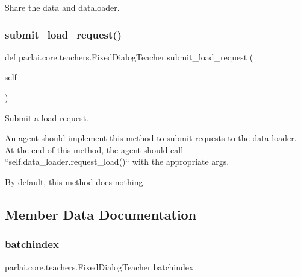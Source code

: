 \begin{DoxyVerb}Share the data and dataloader.
\end{DoxyVerb}
 \mbox{\label{classparlai_1_1core_1_1teachers_1_1FixedDialogTeacher_a8923ee1255939443c7a6ea1532a2fe40}} 
\subsubsection{\texorpdfstring{submit\+\_\+load\+\_\+request()}{submit\_load\_request()}}
{\footnotesize\ttfamily def parlai.\+core.\+teachers.\+Fixed\+Dialog\+Teacher.\+submit\+\_\+load\+\_\+request (\begin{DoxyParamCaption}\item[{}]{self }\end{DoxyParamCaption})}

\begin{DoxyVerb}Submit a load request.

An agent should implement this method to submit requests to the data
loader. At the end of this method, the agent should call
``self.data_loader.request_load()`` with the appropriate args.

By default, this method does nothing.
\end{DoxyVerb}
 

\subsection{Member Data Documentation}
\mbox{\label{classparlai_1_1core_1_1teachers_1_1FixedDialogTeacher_a468d55710137a42b18f85212d7068c47}} 
\subsubsection{\texorpdfstring{batchindex}{batchindex}}
{\footnotesize\ttfamily parlai.\+core.\+teachers.\+Fixed\+Dialog\+Teacher.\+batchindex}

